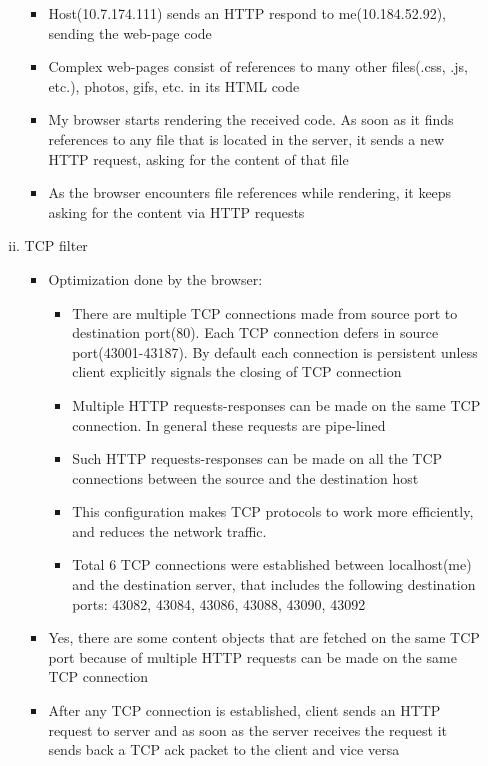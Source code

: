 \documentclass{article}
\begin{document}
\begin{enumerate}[a)]
\begin{enumerate}[i)]
\begin{itemize}
                        \item Host(10.7.174.111) sends an HTTP respond to me(10.184.52.92), sending the web-page code
                        \item Complex web-pages consist of references to many other files(.css, .js, etc.), photos, gifs,  etc. in its HTML code
                        \item My browser starts rendering the received code. As soon as it finds references to any file that is located in the server, it sends a new HTTP request, asking for the content of that file
                        \item As the browser encounters file references while rendering, it keeps asking for the content via HTTP requests
                    \end{itemize}{}
                \item TCP filter
                    \begin{itemize}
                        \item Optimization done by the browser:
                        \begin{itemize}
                            \item There are multiple TCP connections made from source port to destination port(80). Each TCP connection defers in source port(43001-43187). By default each connection is persistent unless client explicitly signals the closing of TCP connection \item Multiple HTTP requests-responses can be made on the same TCP connection. In general these requests are pipe-lined
                            \item Such HTTP requests-responses can be made on all the TCP connections between the source and the destination host
                            \item This configuration makes TCP protocols to work more efficiently, and reduces the network traffic.
                            \item Total 6 TCP connections were established between localhost(me) and the destination server, that includes the following destination ports: 43082, 43084, 43086, 43088, 43090, 43092
                        \end{itemize}{}
                        \item Yes, there are some content objects that are fetched on the same TCP port because of multiple HTTP requests can be made on the same TCP connection
                        \item After any TCP connection is established, client sends an HTTP request to server and as soon as the server receives the request it sends back a TCP ack packet to the client and vice versa

\end{itemize}
\end{enumerate}
\end{enumerate}
\end{document}

